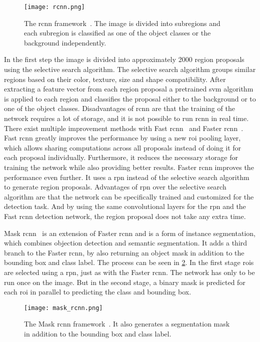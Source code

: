 \begin{figure}[htb]
    \centering
    \texttt{[image: rcnn.png]}
    \caption[ framework]{The \acrshort{rcnn} framework~\cite{Girshick2014}. The image is divided into subregions and each subregion is classified as one of the object classes or the background independently.}
    \label{fig:rcnn}
\end{figure}
In the first step the image is divided into approximately 2000 region proposals using the selective search algorithm.
The selective search algorithm groups similar regions based on their color, texture, size and shape compatibility.
After extracting a feature vector from each region proposal a pretrained \gls{svm} algorithm is applied to each region and classifies the proposal either to the background or to one of the object classes.
Disadvantages of \gls{rcnn} are that the training of the network requires a lot of storage, and it is not possible to run \gls{rcnn} in real time.
There exist multiple improvement methods with Fast \gls{rcnn}~\cite{Girshick2015} and Faster \gls{rcnn}~\cite{Ren2017}.
Fast \gls{rcnn} greatly improves the performance by using a new \gls{roi} pooling layer, which allows sharing computations across all proposals instead of doing it for each proposal individually.
Furthermore, it reduces the necessary storage for training the network while also providing better results.
Faster \gls{rcnn} improves the performance even further.
It uses a \gls{rpn} instead of the selective search algorithm to generate region proposals.
Advantages of \gls{rpn} over the selective search algorithm are that the network can be specifically trained and customized for the detection task.
And by using the same convolutional layers for the \gls{rpn} and the Fast \gls{rcnn} detection network, the region proposal does not take any extra time.

Mask \gls{rcnn}~\cite{He2017} is an extension of Faster \gls{rcnn} and is a form of instance segmentation, which combines objection detection and semantic segmentation.
It adds a third branch to the Faster \gls{rcnn}, by also returning an object mask in addition to the bounding box and class label.
The process can be seen in \cref{fig:mask_rcnn}.
In the first stage \glspl{roi} are selected using a \gls{rpn}, just as with the Faster \gls{rcnn}.
The network has only to be run once on the image.
But in the second stage, a binary mask is predicted for each \gls{roi} in parallel to predicting the class and bounding box.
\begin{figure}[htbp]
    \centering
    \texttt{[image: mask\_rcnn.png]}
    \caption[Mask  framework]{The Mask \acrshort{rcnn} framework~\cite{He2017}. It also generates a segmentation mask in addition to the bounding box and class label.}
    \label{fig:mask_rcnn}
\end{figure}



